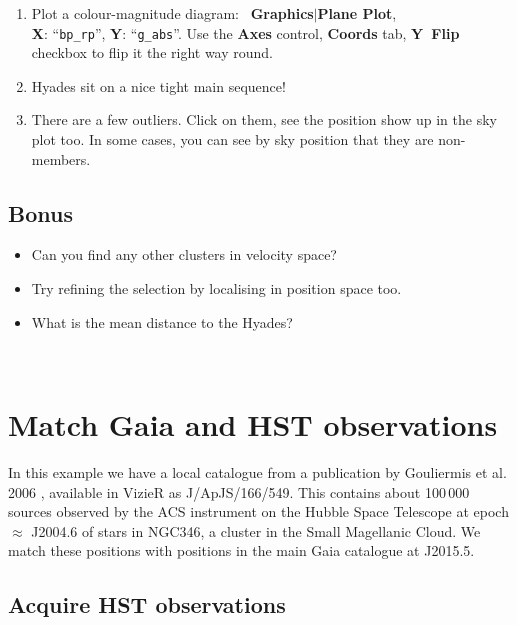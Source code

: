 \documentclass{article}
\newcommand{\buttimg}[1]
           {\mbox{\vtop{\vskip-2ex\hbox{\texttt{[image: \#1]}}}}}
\newcommand{\winfig}[2]
           {\vspace*{-0.5cm}
            \hspace*{0.5cm}\mbox{\vtop{\hbox{\texttt{[image: \#2]}}}}}
\newcommand{\lab}[1]{{\bf #1}}
\newcommand{\mb}[3]{\buttimg{#1}~\lab{#2}$\mid$\lab{#3}}
\newcommand{\entry}[2]{\lab{#1}: ``{\tt #2}''}
\begin{document}
\begin{minipage}[t]{11cm}
  \raggedright
  \begin{enumerate}
  \item Plot a colour-magnitude diagram:
        \mb{planeplot_button.png}{Graphics}{Plane Plot}, \\
        \entry{X}{bp\_rp}, \entry{Y}{g\_abs}.
        Use the \buttimg{axes_button.png} \lab{Axes} control,
        \lab{Coords} tab, \lab{Y~Flip} checkbox
        to flip it the right way round.
  \item Hyades sit on a nice tight main sequence!
  \item There are a few outliers.
        Click on them, see the position show up in the sky plot too.
        In some cases, you can see by sky position that they are non-members.
  \end{enumerate}

  \subsection*{Bonus}
  \begin{itemize}
    \item Can you find any other clusters in velocity space?
    \item Try refining the selection by localising in position space too.
    \item What is the mean distance to the Hyades?
  \end{itemize}
\end{minipage}
\begin{minipage}[t]{8cm}
  \winfig{width=8cm}{hy_cmd.png}
  \\[1cm]
  \winfig{width=8cm}{hy_sky.png}
\end{minipage}

\newpage
\section{Match Gaia and HST observations}

In this example we have a local catalogue from a publication
by Gouliermis et al. 2006 \cite{gouliermis},
available in VizieR as J/ApJS/166/549.
This contains about 100\,000 sources observed by the ACS instrument
on the Hubble Space Telescope at epoch $\approx$ J2004.6
of stars in NGC346, a cluster in the Small Magellanic Cloud.
We match these positions with positions in the main Gaia catalogue at
J2015.5.

\subsection{Acquire HST observations}
\end{document}
